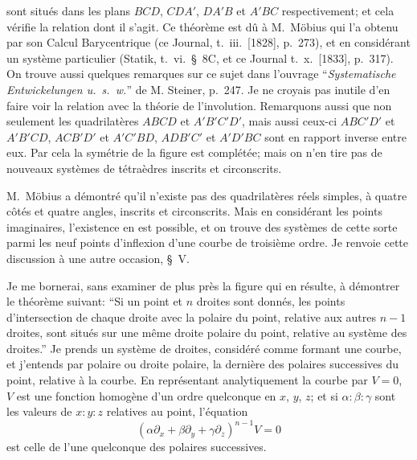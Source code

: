 \documentclass[11pt]{article}
\begin{document}
\bigskip

\noindent sont situ\'es dans les plans $BCD$, $CDA'$, $DA'B$ et $A'BC$ respectivement; et cela v\'erifie
la relation dont il s'agit. Ce th\'eor\`eme est d\^u \`a M.~M\"obius qui l'a obtenu par son
Calcul Barycentrique (ce Journal, t.~iii.\ [1828], p.~273), et en consid\'erant un syst\`eme
particulier (Statik, t.~vi.\ \S\ 8C, et ce Journal t.~x.\ [1833], p.~317). On trouve aussi quelques
remarques sur ce sujet dans l'ouvrage ``\emph{Systematische Entwickelungen u.\ s.\ w.}'' de M.
Steiner, p.~247. Je ne croyais pas inutile d'en faire voir la relation avec la th\'eorie
de l'involution. Remarquons aussi que non seulement les quadrilat\`eres $ABCD$ et $A'B'C'D'$,
mais aussi ceux-ci $ABC'D'$ et $A'B'CD$, $ACB'D'$ et $A'C'BD$, $ADB'C'$ et $A'D'BC$ sont en
rapport inverse entre eux. Par cela la sym\'etrie de la figure est compl\'et\'ee; mais on
n'en tire pas de nouveaux syst\`emes de t\'etra\`edres inscrits et circonscrits.

\medskip
M.~M\"obius a d\'emontr\'e qu'il n'existe pas des quadrilat\`eres r\'eels simples, \`a quatre
c\^ot\'es et quatre angles, inscrits et circonscrits. Mais en consid\'erant les points imaginaires,
l'existence en est possible, et on trouve des syst\`emes de cette sorte parmi les neuf
points d'inflexion d'une courbe de troisi\`eme ordre. Je renvoie cette discussion \`a une
autre occasion, \S\ V.

\medskip
Je me bornerai, sans examiner de plus pr\`es la figure qui en r\'esulte, \`a d\'emontrer
le th\'eor\`eme suivant: ``Si un point et $n$ droites sont donn\'es, les points d'intersection
de chaque droite avec la polaire du point, relative aux autres $n - 1$ droites, sont situ\'es
sur une m\^eme droite polaire du point, relative au syst\`eme des droites.'' Je prends un
syst\`eme de droites, consid\'er\'e comme formant une courbe, et j'entends par polaire ou
droite polaire, la derni\`ere des polaires successives du point, relative \`a la courbe. En
repr\'esentant analytiquement la courbe par $V = 0$, $V$ est une fonction homog\`ene d'un
ordre quelconque en $x$, $y$, $z$; et si $\alpha : \beta : \gamma$ sont les valeurs de $x : y : z$ relatives au
point, l'\'equation
\[
(\alpha \partial_{x} + \beta \partial_{y} + \gamma \partial_{z})^{n-1} V = 0
\]
est celle de l'une quelconque des polaires successives.
\end{document}
